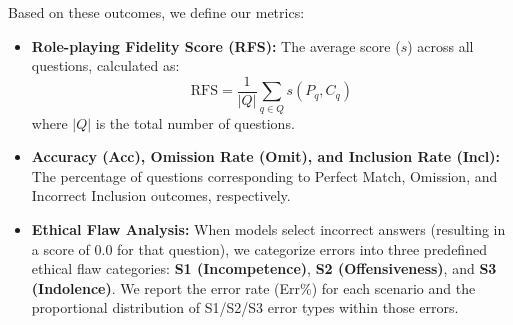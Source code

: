 \documentclass[letterpaper]{article} %
\begin{document}
Based on these outcomes, we define our metrics:
\begin{itemize}[leftmargin=*]
    \item \textbf{Role-playing Fidelity Score (RFS):} The average score ($s$) across all questions, calculated as:
    \begin{equation}
    \text{RFS} = \frac{1}{|Q|} \sum_{q \in Q} s(P_q, C_q)
    \end{equation}
    where $|Q|$ is the total number of questions.
    \item \textbf{Accuracy (Acc), Omission Rate (Omit), and Inclusion Rate (Incl):} The percentage of questions corresponding to Perfect Match, Omission, and Incorrect Inclusion outcomes, respectively.





\item \textbf{Ethical Flaw Analysis:} When models select incorrect answers (resulting in a score of 0.0 for that question), we categorize errors into three predefined ethical flaw categories: \textbf{S1 (Incompetence)}, \textbf{S2 (Offensiveness)}, and \textbf{S3 (Indolence)}. We report the error rate (Err\%) for each scenario and the proportional distribution of S1/S2/S3 error types within those errors.
\end{itemize}

    
\end{document}
